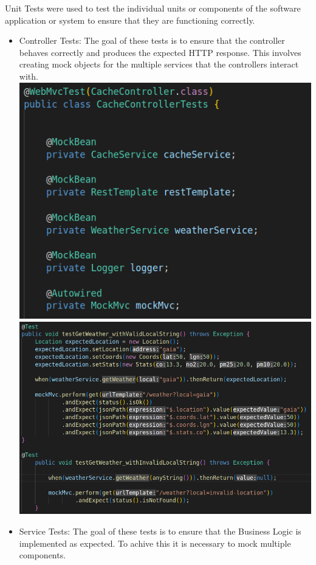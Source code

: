 \documentclass[12pt]{article}
\begin{document}
Unit Tests were used to test the individual units or components of the software application or system to ensure that they are functioning correctly. 
\begin{itemize}
\item Controller Tests: The goal of these tests is to ensure that the controller behaves correctly and produces the expected HTTP response. This involves creating mock objects for the multiple services that the controllers interact with.
\includegraphics[scale=0.5]{ControllerMocks.png}
\\
\includegraphics[scale=0.45]{ControllerExample.png}
\item Service Tests: The goal of these tests is to ensure that the Business Logic is implemented as expected. To achive this it is necessary to mock multiple components.

\end{itemize}
\end{document}

